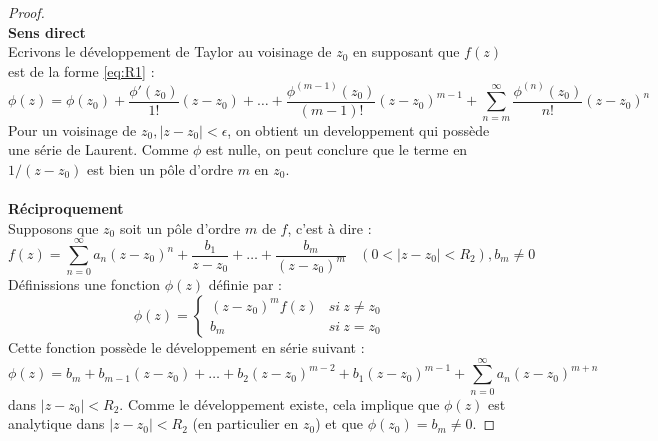	\begin{proof}\ \\
	\textbf{Sens direct}\\
	Ecrivons le développement de Taylor au voisinage de $z_0$ en supposant que $f(z)$ 
	est de la forme \autoref{eq:R1}  :
	\begin{equation}
	\phi(z) = \phi(z_0)+ \frac{\phi'(z_0)}{1!}(z-z_0) + \dots + \frac{\phi^{(m-1)}(z_0)}{(m-1)!}
	(z-z_0)^{m-1} + \sum_{n=m}^\infty  \frac{\phi^{(n)}(z_0)}{n!}(z-z_0)^n
	\end{equation}
	Pour un voisinage de $z_0, |z-z_0|<\epsilon$, on obtient un developpement qui possède 
	une série de Laurent. Comme $\phi$ est nulle, on peut conclure que le terme en $1/(z-z_0)$
	est bien un pôle d'ordre $m$ en $z_0$.
	\ \\
	\ \\
	\textbf{Réciproquement}\\
	Supposons que $z_0$ soit un pôle d'ordre $m$ de $f$, c'est à dire :
	\begin{equation}
	f(z) = \sum_{n=0}^\infty a_n(z-z_0)^n + \frac{b_1}{z-z_0}+\dots+\frac{b_m}{(z-z_0)^m}\ \
	\ \ (0<|z-z_0|<R_2), b_m\neq0
	\end{equation}
	Définissions une fonction $\phi(z)$ définie par :
	\begin{equation}
	\phi(z) = \left\{\begin{array}{ll}
	(z-z_0)^mf(z) &si\ z\neq z_0\\
	b_m &si\ z=z_0
	\end{array}\right.
	\end{equation}
	Cette fonction possède le développement en série suivant :
	\begin{equation}
	\phi(z) = b_m + b_{m-1}(z-z_0) + \dots +b_2(z-z_0)^{m-2} + b_1(z-z_0)^{m-1} + 
	\sum_{n=0}^\infty a_n(z-z_0)^{m+n}
	\end{equation}
	dans $|z-z_0| < R_2$. Comme le développement existe, cela implique que $\phi(z)$ est 
	analytique dans $|z-z_0|<R_2$ (en particulier en $z_0$) et que $\phi(z_0)=b_m\neq0$.
	\end{proof}
	
	\ \\	
	

